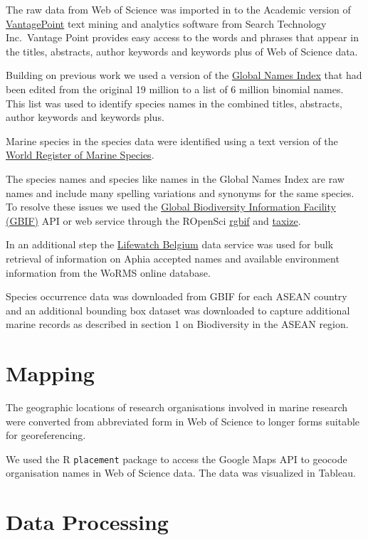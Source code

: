 \documentclass[]{book}
\theoremstyle{definition}
\theoremstyle{definition}
\theoremstyle{definition}
\theoremstyle{remark}
\begin{document}
The raw data from Web of Science was imported in to the Academic version
of \href{https://thevantagepoint.com/}{VantagePoint} text mining and
analytics software from Search Technology Inc.~Vantage Point provides
easy access to the words and phrases that appear in the titles,
abstracts, author keywords and keywords plus of Web of Science data.

Building on previous work we used a version of the
\href{http://gni.globalnames.org/}{Global Names Index} that had been
edited from the original 19 million to a list of 6 million binomial
names. This list was used to identify species names in the combined
titles, abstracts, author keywords and keywords plus.

Marine species in the species data were identified using a text version
of the \href{http://www.marinespecies.org/}{World Register of Marine
Species}.

The species names and species like names in the Global Names Index are
raw names and include many spelling variations and synonyms for the same
species. To resolve these issues we used the
\href{https://www.gbif.org/}{Global Biodiversity Information Facility
(GBIF)} API or web service through the ROpenSci \href{}{rgbif} and
\href{}{taxize}.

In an additional step the
\href{http://www.lifewatch.be/data-services/?cache=1521050271}{Lifewatch
Belgium} data service was used for bulk retrieval of information on
Aphia accepted names and available environment information from the
WoRMS online database.

Species occurrence data was downloaded from GBIF for each ASEAN country
and an additional bounding box dataset was downloaded to capture
additional marine records as described in section 1 on Biodiversity in
the ASEAN region.

\hypertarget{mapping}{%
\section{Mapping}\label{mapping}}

The geographic locations of research organisations involved in marine
research were converted from abbreviated form in Web of Science to
longer forms suitable for georeferencing.

We used the R \texttt{placement} package to access the Google Maps API
to geocode organisation names in Web of Science data. The data was
visualized in Tableau.

\hypertarget{data-processing}{%
\section{Data Processing}\label{data-processing}}
\end{document}
